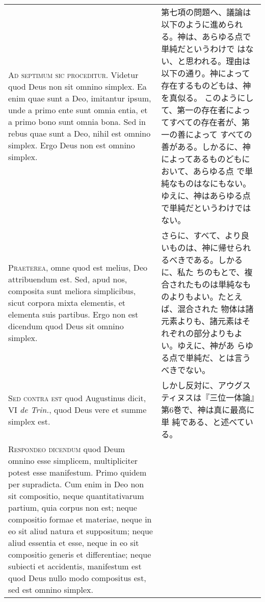 \documentclass[10pt]{jsarticle} %
\begin{document}
\begin{longtable}{p{21em}p{21em}}

{\huge A}{\scshape d septimum sic proceditur}. Videtur quod Deus non sit
 omnino simplex. Ea enim quae sunt a Deo, imitantur ipsum, unde a primo
 ente sunt omnia entia, et a primo bono sunt omnia bona. Sed in rebus
 quae sunt a Deo, nihil est omnino simplex. Ergo Deus non est omnino
 simplex.

&

第七項の問題へ、議論は以下のように進められる。神は、あらゆる点で単純だというわけで
 はない、と思われる。理由は以下の通り。神によって存在するものどもは、神を真似る。
 このようにして、第一の存在者によってすべての存在者が、第一の善によって
 すべての善がある。しかるに、神によってあるものどもにおいて、あらゆる点
 で単純なものはなにもない。ゆえに、神はあらゆる点で単純だというわけでは
 ない。

\\

{\scshape Praeterea}, omne quod est melius, Deo attribuendum est. Sed,
 apud nos, composita sunt meliora simplicibus, sicut corpora mixta
 elementis, et elementa suis partibus. Ergo non est dicendum quod Deus
 sit omnino simplex.

&


さらに、すべて、より良いものは、神に帰せられるべきである。しかるに、私た
 ちのもとで、複合されたものは単純なものよりもよい。たとえば、混合された
 物体は諸元素よりも、諸元素はそれぞれの部分よりもよい。ゆえに、神があ
 らゆる点で単純だ、とは言うべきでない。

\\

{\scshape Sed contra est} quod Augustinus dicit, VI {\itshape de Trin.}, quod Deus vere et
 summe simplex est.

&

しかし反対に、アウグスティヌスは『三位一体論』第6巻で、神は真に最高に単
 純である、と述べている。

\\

{\scshape Respondeo dicendum} quod Deum omnino esse simplicem,
 multipliciter potest esse manifestum. Primo quidem per supradicta. Cum
 enim in Deo non sit compositio, neque quantitativarum partium, quia
 corpus non est; neque compositio formae et materiae, neque in eo sit
 aliud natura et suppositum; neque aliud essentia et esse, neque in eo
 sit compositio generis et differentiae; neque subiecti et accidentis,
 manifestum est quod Deus nullo modo compositus est, sed est omnino
 simplex.


\end{longtable}
\end{document}
